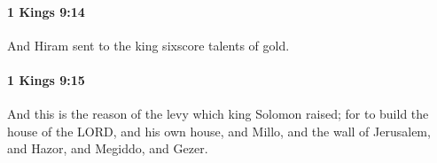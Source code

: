 		\paragraph{1 Kings 9:14} %
			\label{1KINGS-9-14}

			And Hiram sent to the king sixscore talents of gold.


		\paragraph{1 Kings 9:15} %
			\label{1KINGS-9-15}

			And this is the reason of the levy which king Solomon raised; for to build the house of the LORD, and his own house, and Millo, and the wall of Jerusalem, and Hazor, and Megiddo, and Gezer.


